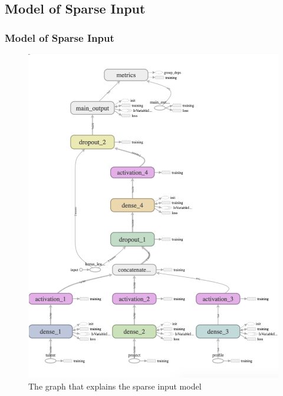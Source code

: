 \documentclass{beamer}
\begin{document}
\subsection{Model of Sparse Input} 
\begin{frame}
\frametitle{Model of Sparse Input}
\begin{figure}
	\includegraphics[scale=0.3]{images/TensorBoardSparseCropped} 
	\caption{The graph that explains the sparse input model}
\end{figure}
\end{frame}
\end{document}
